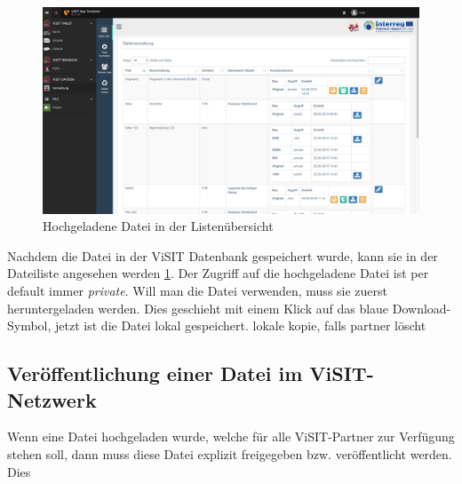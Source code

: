 \begin{figure}[ht!]
\centering
\includegraphics[width=12cm]{Figures/paula/dateiverwaltung/datei_in_listenuebersicht.png}
\caption{Hochgeladene Datei in der Listenübersicht}
\label{img:datei_in_listenuebersichtn}
\end{figure}

Nachdem die Datei in der ViSIT Datenbank gespeichert wurde, kann sie in der Dateiliste angesehen werden \ref{img:datei_in_listenuebersichtn}. Der Zugriff auf die hochgeladene Datei ist per default immer \textit{private}. Will man die Datei verwenden, muss sie zuerst heruntergeladen werden. Dies geschieht mit einem Klick auf das blaue Download-Symbol, jetzt ist die Datei lokal gespeichert. lokale kopie, falls partner löscht

\subsection{Veröffentlichung einer Datei im ViSIT-Netzwerk}

Wenn eine Datei hochgeladen wurde, welche für alle ViSIT-Partner zur Verfügung stehen soll, dann muss diese Datei explizit freigegeben bzw. veröffentlicht werden. Dies
\cite{anno4j1}